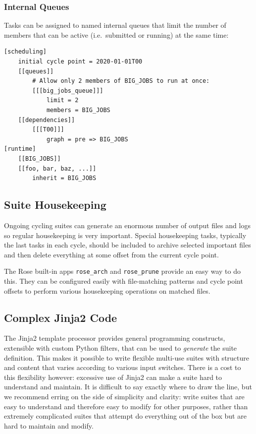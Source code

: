 \subsubsection{Internal Queues}

Tasks can be assigned to named internal queues that limit the number of members
that can be active (i.e.\ submitted or running) at the same time:

\lstset{language=suiterc}
\begin{lstlisting}
[scheduling]
    initial cycle point = 2020-01-01T00
    [[queues]]
        # Allow only 2 members of BIG_JOBS to run at once:
        [[[big_jobs_queue]]]
            limit = 2
            members = BIG_JOBS
    [[dependencies]]
        [[[T00]]]
            graph = pre => BIG_JOBS
[runtime]
    [[BIG_JOBS]]
    [[foo, bar, baz, ...]]
        inherit = BIG_JOBS
\end{lstlisting}

\subsection{Suite Housekeeping}
\label{Suite Housekeeping}

Ongoing cycling suites can generate an enormous number of output files and logs
so regular housekeeping is very important. Special housekeeping tasks,
typically the last tasks in each cycle, should be included to archive selected
important files and then delete everything at some offset from the current
cycle point.

The Rose built-in apps \lstinline=rose_arch= and \lstinline=rose_prune=
provide an easy way to do this. They can be configured easily with
file-matching patterns and cycle point offsets to perform various housekeeping
operations on matched files.

\subsection{Complex Jinja2 Code}

The Jinja2 template processor provides general programming constructs,
extensible with custom Python filters, that can be used to {\em generate} the
suite definition. This makes it possible to write flexible multi-use
suites with structure and content that varies according to various input
switches. There is a cost to this flexibility however: excessive use of Jinja2
can make a suite hard to understand and maintain. It is difficult to say
exactly where to draw the line, but we recommend erring on the side of
simplicity and clarity: write suites that are easy to understand and therefore
easy to modify for other purposes, rather than extremely complicated suites
that attempt do everything out of the box but are hard to maintain and modify.


